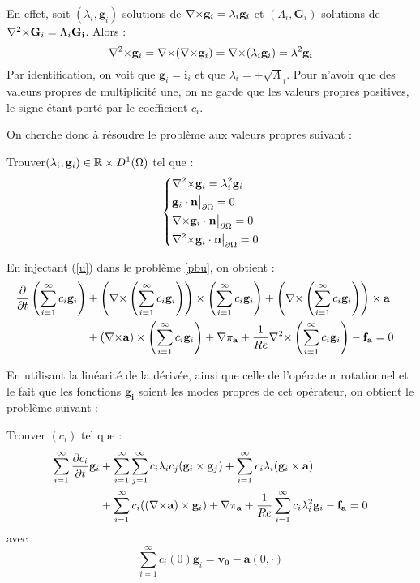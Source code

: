 En effet, soit $(\lambda_i,\mathbf{g}_i)$ solutions de ${\nabla\times} \mathbf{g}_i = \lambda_i\mathbf{g}_i$ et $(\Lambda_i,\mathbf{G}_i)$ solutions de ${\nabla^2\times} \mathbf{G}_i = \Lambda_i\mathbf{G_i}$. Alors :
\[ {\nabla^2\times} \mathbf{g}_i = {\nabla\times}({\nabla\times} \mathbf{g}_i)={\nabla\times}(\lambda_i\mathbf{g}_i)=\lambda^2\mathbf{g}_i \]
Par identification, on voit que $\mathbf{g}_i=\mathbf{i}_i$ et que $\lambda_i=\pm\sqrt\Lambda_i$. Pour n'avoir que des valeurs propres de multiplicité une, on ne garde que les valeurs propres positives, le signe étant porté par le coefficient $c_i$.

On cherche donc à résoudre le problème aux valeurs propres suivant :
\begin{pb}\label{curlcurl}
Trouver$(\lambda_i,\mathbf{g}_i)\in{\mathbb{R}}\times D^1(\Omega)$ tel que :
\begin{equation*}
\left\{\begin{aligned}
&{\nabla^2\times}  \mathbf{g}_i = \lambda_i^2 \mathbf{g}_i\\
&\mathbf{g}_i\cdot \mathbf{n}{\big\rvert_{\partial\Omega}} = 0\\
&{\nabla\times} \mathbf{g}_i\cdot \mathbf{n}{\big\rvert_{\partial\Omega}} = 0\\
&{\nabla^2\times}  \mathbf{g}_i\cdot \mathbf{n}{\big\rvert_{\partial\Omega}} = 0
\end{aligned}\right.
\end{equation*}\end{pb}

En injectant (\ref{u}) dans le problème \ref{pbu}, on obtient :
\begin{align*}
\frac{\partial}{\partial t}\left(\sum_{i=1}^\infty c_i\mathbf{g}_i\right) &+ \left({\nabla\times} \left(\sum_{i=1}^\infty c_i\mathbf{g}_i\right)\right)\times \left(\sum_{i=1}^\infty c_i\mathbf{g}_i\right) + \left({\nabla\times} \left(\sum_{i=1}^\infty c_i\mathbf{g}_i\right)\right)\times \mathbf{a}&\\
&+ ({\nabla\times} \mathbf{a})\times \left(\sum_{i=1}^\infty c_i\mathbf{g}_i\right) + {\nabla} \pi_{\mathbf{a}} +\frac{1}{Re}{\nabla^2\times}  \left(\sum_{i=1}^\infty c_i\mathbf{g}_i\right) - \mathbf{f_a} =0\\
\end{align*}

En utilisant la linéarité de la dérivée, ainsi que celle de l'opérateur rotationnel et le fait que les fonctions $\bm{g_i}$ soient les modes propres de cet opérateur, on obtient le problème suivant :
\begin{pb}\label{pbc}
Trouver $(c_i)$ tel que :
\begin{align*}
\sum_{i=1}^\infty\frac{\partial c_i}{\partial t}\mathbf{g}_i &+ \sum_{i=1}^\infty\sum_{j=1}^\infty c_i\lambda_ic_j(\mathbf{g}_i\times \mathbf{g}_j) + \sum_{i=1}^\infty c_i\lambda_i(\mathbf{g}_i\times \mathbf{a})\\
& + \sum_{i=1}^\infty c_i(({\nabla\times}\mathbf{a})\times \mathbf{g}_i) + {\nabla} \pi_{\mathbf{a}} +\frac{1}{Re}\sum_{i=1}^\infty c_i\lambda_i^2\mathbf{g}_i - \mathbf{f_a} = 0\\
\end{align*}
avec \[ \sum_{i=1}^\infty c_i(0)\mathbf{g}_i = \mathbf{v_0}-\mathbf{a}(0,\cdot) \]
\end{pb}

